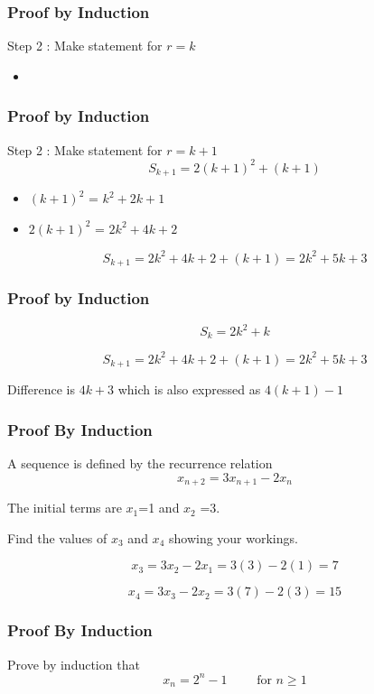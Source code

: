 \documentclass{beamer}
\begin{document}
\begin{frame}
\frametitle{Proof by Induction}
Step 2  : Make statement for $r=k$
\begin{itemize}
\item 
\end{itemize}
\end{frame}
\begin{frame}
\frametitle{Proof by Induction}
Step 2  : Make statement for $r=k+1$
\[S_{k+1} = 2(k+1)^2 + (k+1)\]
\begin{itemize}
\item $(k+1)^2$ = $k^2 + 2k + 1$
\item $2(k+1)^2$ = $2k^2 + 4k + 2$
\end{itemize}
\[S_{k+1} = 2k^2 + 4k + 2+ (k+1) = 2k^2 + 5k + 3 \]
\end{frame}
\begin{frame}
\frametitle{Proof by Induction}

\[S_{k} = 2k^2 + k\]

\[S_{k+1} = 2k^2 + 4k + 2+ (k+1) = 2k^2 + 5k + 3 \]

Difference is $4k+3$ which is also expressed as $4(k+1)-1$

\end{frame}
\begin{frame}
\frametitle{Proof By Induction}
\large

A sequence is defined by the recurrence relation
\[ x_{n+2} = 3x_{n+1} - 2x_{n} \]

The initial terms are $x_1$=1 and $x_2$ =3.

Find the values of $x_3$ and $x_4$ showing your workings.

\[ x_{3} = 3x_{2} - 2x_{1} = 3(3) - 2(1) = 7 \]

\[ x_{4} = 3x_{3} - 2x_{2} = 3(7) - 2(3) = 15 \]


\end{frame}
\begin{frame}
\frametitle{Proof By Induction}
\large
Prove by induction that
\[ x_n = 2^n - 1 \qquad \mbox{ for } n \geq 1 \]

\end{frame}
\end{document}
